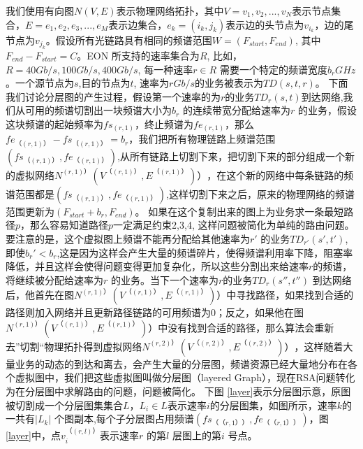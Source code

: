 我们使用有向图$N(V,E)$表示物理网络拓扑，其中$V={v_1,v_2,...,v_N}$表示节点集合，$E={e_1,e_2,e_3,...,e_M}$表示边集合，$e_k=(i_k,j_k)$表示边的头节点为$v_{i_k}$，边的尾节点为$v_{j_k}$。假设所有光链路具有相同的频谱范围$W=(F_{start},F_{end})$, 其中$F_{end}-F_{start}=C$。EON 所支持的速率集合为$R$, 比如，$R={40Gb/s,100Gb/s,400Gb/s}$, 每一种速率$r\in R$ 需要一个特定的频谱宽度$b_r GHz$。一个源节点为$s$,目的节点为$t$, 速率为$r Gb/s$的业务被表示为$TD(s,t,r)$。
下面我们讨论分层图的产生过程，假设第一个速率的为$r$的业务$TD_r(s,t)$到达网络,我们从可用的频谱切割出一块频谱大小为$b_r$ 的连续带宽分配给速率为$r$ 的业务，假设这块频谱的起始频率为$fs_{( r,1 )}$，终止频谱为$fe_{( r,1 )}$，那么$fe_{（ (r,1) ）}-fs_{（ (r,1) ）}=b_r$，我们把所有物理链路上频谱范围$( fs_{（ (r,1) ）},fe_{（ (r,1) ）} )$,从所有链路上切割下来，把切割下来的部分组成一个新的虚拟网络$N^{( r,1) ）} ( V^{（ (r,1) ）},E^{（ (r,1) ）}) ）$，在这个新的网络中每条链路的频谱范围都是$(fs_{（ (r,1) ）},fe_{（ (r,1) ）})$,这样切割下来之后，原来的物理网络的频谱范围更新为$( F_{start}+b_r,F_{end} )$。
如果在这个复制出来的图上为业务求一条最短路径$p$，那么容易知道路径$p$一定满足约束2,3,4, 这样问题被简化为单纯的路由问题。要注意的是，这个虚拟图上频谱不能再分配给其他速率为$r'$ 的业务$TD_{r'}(s',t')$, 即使$b_r'<b_r$,这是因为这样会产生大量的频谱碎片，使得频谱利用率下降，阻塞率降低，并且这样会使得问题变得更加复杂化，所以这些分割出来给速率$r$的频谱，将继续被分配给速率为$r$ 的业务。当下一个速率为$r$的业务$TD_r (s'',t'')$ 到达网络后，他首先在图$N^{( r,1) ）} ( V^{（ (r,1) ）},E^{（ (r,1) ）}) ）$中寻找路径，如果找到合适的路径则加入网络并且更新路径链路的可用频谱为0；反之，如果他在图$N^{( r,1) ）} ( V^{（ (r,1) ）},E^{（ (r,1) ）}) ）$中没有找到合适的路径，那么算法会重新去”切割“物理拓扑得到虚拟网络$N^{( r,2) ）} ( V^{（ (r,2) ）},E^{（ (r,2) ）}) ）$，这样随着大量业务的动态的到达和离去，会产生大量的分层图，频谱资源已经大量地分布在各个虚拟图中，我们把这些虚拟图叫做分层图（layered Graph），现在RSA问题转化为在分层图中求解路由的问题，问题被简化。
下图 \ref{layer}表示分层图示意，原图被切割成一个分层图集集合$L$，$L_i \in L$表示速率$i$的分层图集，如图所示，速率$k$的一共有$|L_k|$ 个图副本,每个子分层图占用频谱$(fs_{（ （r,1） ）},fe_{（ （r,1） ）})$，图 \ref{layer}中，点$v_i^{（ (r,l) ）}$表示速率$r$ 的第$l$ 层图上的第$i$ 号点。
